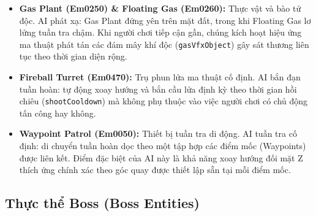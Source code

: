 \documentclass[../DoAn.tex]{subfiles}
\begin{document}
\begin{itemize}
    \item \textbf{Gas Plant (Em0250) \& Floating Gas (Em0260):} Thực vật và bào tử độc. AI phát xạ: Gas Plant đứng yên trên mặt đất, trong khi Floating Gas lơ lửng tuần tra chậm. Khi người chơi tiếp cận gần, chúng kích hoạt hiệu ứng ma thuật phát tán các đám mây khí độc (\texttt{gasVfxObject}) gây sát thương liên tục theo thời gian diện rộng.
    \item \textbf{Fireball Turret (Em0470):} Trụ phun lửa ma thuật cố định. AI bắn đạn tuần hoàn: tự động xoay hướng và bắn cầu lửa định kỳ theo thời gian hồi chiêu (\texttt{shootCooldown}) mà không phụ thuộc vào việc người chơi có chủ động tấn công hay không.
    \item \textbf{Waypoint Patrol (Em0050):} Thiết bị tuần tra di động. AI tuần tra cố định: di chuyển tuần hoàn dọc theo một tập hợp các điểm mốc (Waypoints) được liên kết. Điểm đặc biệt của AI này là khả năng xoay hướng đối mặt Z thích ứng chính xác theo góc quay được thiết lập sẵn tại mỗi điểm mốc.
\end{itemize}

\subsection{Thực thể Boss (Boss Entities)}
\label{subsection:3.7.3}
\end{document}
